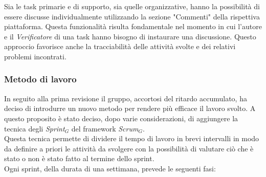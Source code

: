 Sia le task primarie e di supporto, sia quelle organizzative, hanno la possibilità di essere discusse individualmente utilizzando la sezione "Commenti" della rispettiva piattaforma. Questa funzionalità risulta fondamentale nel momento in cui l'autore e il \textit{Verificatore} di una task hanno bisogno di instaurare una discussione. Questo approccio favorisce anche la tracciabilità delle attività svolte e dei relativi problemi incontrati.

\subsubsection{Metodo di lavoro}

In seguito alla prima revisione il gruppo, accortosi del ritardo accumulato, ha deciso di introdurre un nuovo metodo per rendere più efficace il lavoro svolto. A questo proposito è stato deciso, dopo varie considerazioni, di aggiungere la tecnica degli \textit{Sprint}$_G$ del framework \textit{Scrum}$_G$.\\
Questa tecnica permette di dividere il tempo di lavoro in brevi intervalli in modo da definire a priori le attività da svolgere con la possibilità di valutare ciò che è stato o non è stato fatto al termine dello sprint.\\
Ogni sprint, della durata di una settimana, prevede le seguenti fasi:
